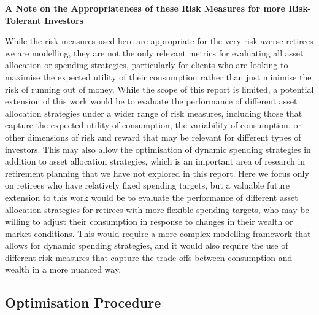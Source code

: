 \documentclass[11pt]{article}
\newcommand{\asideboxtitle}[1]{\noindent\textbf{\large #1}\par\vspace{0.5em}}
\begin{document}
\begin{asidebox}
  \asideboxtitle{A Note on the Appropriateness of these Risk Measures for more Risk-Tolerant Investors}
  
  While the risk measures used here are appropriate for the very risk-averse retirees we are modelling, they are not the only relevant metrics for evaluating all asset allocation or spending strategies, particularly for clients who are looking to maximise the expected utility of their consumption rather than just minimise the risk of running out of money. While the scope of this report is limited, a potential extension of this work would be to evaluate the performance of different asset allocation strategies under a wider range of risk measures, including those that capture the expected utility of consumption, the variability of consumption, or other dimensions of risk and reward that may be relevant for different types of investors. This may also allow the optimisation of dynamic spending strategies in addition to asset allocation strategies, which is an important area of research in retirement planning that we have not explored in this report. Here we focus only on retirees who have relatively fixed spending targets, but a valuable future extension to this work would be to evaluate the performance of different asset allocation strategies for retirees with more flexible spending targets, who may be willing to adjust their consumption in response to changes in their wealth or market conditions. This would require a more complex modelling framework that allows for dynamic spending strategies, and it would also require the use of different risk measures that capture the trade-offs between consumption and wealth in a more nuanced way.

\end{asidebox}


\subsection{Optimisation Procedure}
\end{document}

